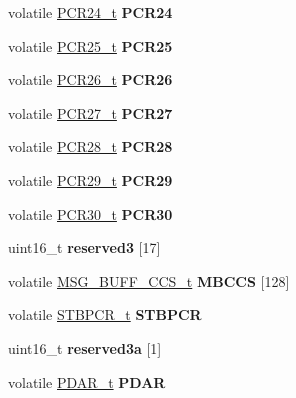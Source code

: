 \begin{DoxyCompactItemize}
volatile \mbox{\hyperlink{unionuPCR24}{P\+C\+R24\+\_\+t}} {\bfseries P\+C\+R24}
\item 
\mbox{\label{structFR__tag_a31a3dfdd5a3d7030af34c788117a8749}} 
volatile \mbox{\hyperlink{unionuPCR25}{P\+C\+R25\+\_\+t}} {\bfseries P\+C\+R25}
\item 
\mbox{\label{structFR__tag_af05861f7e74709f42ad13b11de79b734}} 
volatile \mbox{\hyperlink{unionuPCR26}{P\+C\+R26\+\_\+t}} {\bfseries P\+C\+R26}
\item 
\mbox{\label{structFR__tag_ab98776b2f21e4eaa7d919a6e7cfc1518}} 
volatile \mbox{\hyperlink{unionuPCR27}{P\+C\+R27\+\_\+t}} {\bfseries P\+C\+R27}
\item 
\mbox{\label{structFR__tag_a38bc86d053247baf0240b49a0f37eede}} 
volatile \mbox{\hyperlink{unionuPCR28}{P\+C\+R28\+\_\+t}} {\bfseries P\+C\+R28}
\item 
\mbox{\label{structFR__tag_ae2f6910961fe1830e5a9eb4f89bad995}} 
volatile \mbox{\hyperlink{unionuPCR29}{P\+C\+R29\+\_\+t}} {\bfseries P\+C\+R29}
\item 
\mbox{\label{structFR__tag_a8c63426020dd96c969f93fb63ce638bf}} 
volatile \mbox{\hyperlink{unionuPCR30}{P\+C\+R30\+\_\+t}} {\bfseries P\+C\+R30}
\item 
\mbox{\label{structFR__tag_a859f297b2a3905ea86febdfa15a5be50}} 
uint16\+\_\+t {\bfseries reserved3} \mbox{[}17\mbox{]}
\item 
\mbox{\label{structFR__tag_aeac7de6d96f45b06e3d8848d60ed2cba}} 
volatile \mbox{\hyperlink{structuMSG__BUFF__CCS}{M\+S\+G\+\_\+\+B\+U\+F\+F\+\_\+\+C\+C\+S\+\_\+t}} {\bfseries M\+B\+C\+CS} \mbox{[}128\mbox{]}
\item 
\mbox{\label{structFR__tag_aa757a034519b99f4b76e8344775453a4}} 
volatile \mbox{\hyperlink{unionuSTBPCR}{S\+T\+B\+P\+C\+R\+\_\+t}} {\bfseries S\+T\+B\+P\+CR}
\item 
\mbox{\label{structFR__tag_a7d47890eb366875dc9b2a98d7560c760}} 
uint16\+\_\+t {\bfseries reserved3a} \mbox{[}1\mbox{]}
\item 
\mbox{\label{structFR__tag_abe3e760d77109ed250220f7f5ca00968}} 
volatile \mbox{\hyperlink{unionuPDAR}{P\+D\+A\+R\+\_\+t}} {\bfseries P\+D\+AR}
\end{DoxyCompactItemize}



